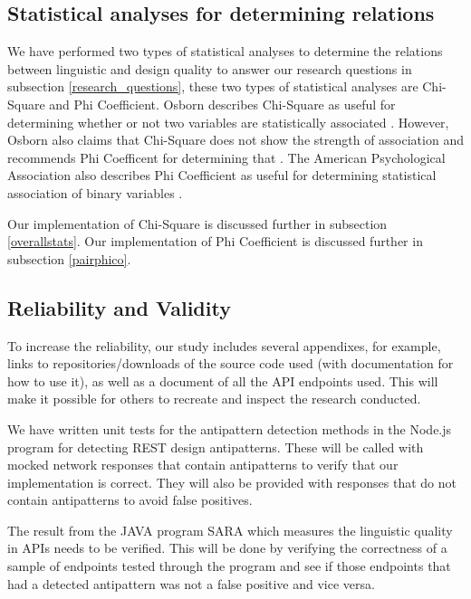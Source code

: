 \subsection{Statistical analyses for determining relations} \label{statistics}

We have performed two types of statistical analyses to determine the relations between linguistic and design quality to answer our research questions in subsection \ref{research_questions}, these two types of statistical analyses are Chi-Square and Phi Coefficient. Osborn describes Chi-Square as useful for determining whether or not two variables are statistically associated \cite{Osborn}. However, Osborn also claims that Chi-Square does not show the strength of association and recommends Phi Coefficent for determining that \cite{Osborn}. The American Psychological Association also describes Phi Coefficient as useful for determining statistical association of binary variables \cite{apa}. 

Our implementation of Chi-Square is discussed further in subsection \ref{overallstats}. Our implementation of Phi Coefficient is discussed further in subsection \ref{pairphico}.

\subsection{Reliability and Validity} \label{Reliability and Validity}

To increase the reliability, our study includes several appendixes, for example, links to repositories/downloads of the source code used (with documentation for how to use it), as well as a document of all the API endpoints used. This will make it possible for others to recreate and inspect the research conducted. 

We have written unit tests for the antipattern detection methods in the Node.js program for detecting REST design antipatterns. These will be called with mocked network responses that contain antipatterns to verify that our implementation is correct. They will also be provided with responses that do not contain antipatterns to avoid false positives.

The result from the JAVA program SARA which measures the linguistic quality in APIs needs to be verified. This will be done by verifying the correctness of a sample of endpoints tested through the program and see if those endpoints that had a detected antipattern was not a false positive and vice versa.

